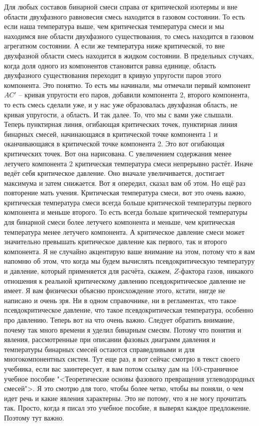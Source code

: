\documentclass[main.tex]{subfiles}
\begin{document}
Для любых составов бинарной смеси справа от критической изотермы и вне области двухфазного равновесия смесь находится в газовом состоянии.
То есть если наша температура выше, чем критическая температура смеси и мы находимся вне области двухфазного существования, то смесь находится в газовом агрегатном состоянии.
А если же температура ниже критической, то вне двухфазной области смесь находится в жидком состоянии.
В предельных случаях, когда доля одного из компонентов становится равна единице, область двухфазного существования переходит в кривую упругости паров этого компонента.
Это понятно.
То есть мы начинали, мы отмечали первый компонент $AC'$ -- кривая упругости его паров, добавили компонента 2, второго компонента, то есть смесь сделали уже, и у нас уже образовалась двухфазная область, не кривая упругости, а область.
И так далее.
То, что мы с вами уже слышали.
Теперь пунктирная линия, огибающая критических точек, пунктирная линия бинарных смесей, начинающаяся в критической точке компонента 1 и оканчивающаяся в критической точке компонента 2.
Это вот огибающая критических точек.
Вот она нарисована.
С увеличением содержания менее летучего компонента 2 критическая температура смеси непрерывно растёт.
Иначе ведёт себя критическое давление.
Оно вначале увеличивается, достигает максимума и затем снижается.
Вот я опередил, сказал вам об этом.
Но ещё раз повторение мать учения.
Критическая температура смеси, вот это очень важно,
критическая температура смеси всегда больше критической температуры первого компонента и меньше второго.
То есть всегда больше критической температуры для бинарной смеси более летучего компонента и меньше, чем критическая температура менее летучего компонента.
А критическое давление смеси может значительно превышать критическое давление как первого, так и второго компонента.
Я не случайно акцентирую ваше внимание на этом, потому что я вам напомню об этом, что когда мы будем вычислять псевдокритическую температуру и давление, который применяется для расчёта, скажем, $Z$-фактора газов, никакого отношения к реальной критическому давлению псевдокритическое давление не имеет.
Я вам физически объясню происхождение этого, кстати, нигде не написано и очень зря.
Ни в одном справочнике, ни в регламентах, что такое псевдокритическое давление, что такое псевдокритическая температура, особенно про давлению.
Теперь вот на что очень важно.
Следует обратить внимание, почему так много времени я уделил бинарным смесям.
Потому что понятия и явления, рассмотренные при описании фазовых диаграмм давления и температуры бинарных смесей остаются справедливыми и для многокомпонентных систем.
Тут еще раз, я вот сейчас смотрю в текст своего учебника, если вас заинтересует, я вам потом ссылку дам на 100-страничное учебное пособие "<Теоретические основы фазового превращения углеводородных смесей">.
Я это смотрю для того, чтобы более четко, чтобы вы поняли, о чем идет речь и какие явления характерны.
Это не потому, что я не могу прочитать так.
Просто, когда я писал это учебное пособие, я выверял каждое предложение.
Поэтому тут важно.
\end{document}
